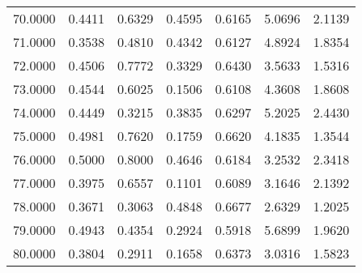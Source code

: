 \begin{longtable}{ p{}  p{}  p{}  p{}  p{} p{}  p{} }
70.0000	&	0.4411	&	0.6329	&	0.4595	&	0.6165	&	5.0696	&	2.1139	\\
71.0000	&	0.3538	&	0.4810	&	0.4342	&	0.6127	&	4.8924	&	1.8354	\\
72.0000	&	0.4506	&	0.7772	&	0.3329	&	0.6430	&	3.5633	&	1.5316	\\
73.0000	&	0.4544	&	0.6025	&	0.1506	&	0.6108	&	4.3608	&	1.8608	\\
74.0000	&	0.4449	&	0.3215	&	0.3835	&	0.6297	&	5.2025	&	2.4430	\\
75.0000	&	0.4981	&	0.7620	&	0.1759	&	0.6620	&	4.1835	&	1.3544	\\
76.0000	&	0.5000	&	0.8000	&	0.4646	&	0.6184	&	3.2532	&	2.3418	\\
77.0000	&	0.3975	&	0.6557	&	0.1101	&	0.6089	&	3.1646	&	2.1392	\\
78.0000	&	0.3671	&	0.3063	&	0.4848	&	0.6677	&	2.6329	&	1.2025	\\
79.0000	&	0.4943	&	0.4354	&	0.2924	&	0.5918	&	5.6899	&	1.9620	\\
80.0000	&	0.3804	&	0.2911	&	0.1658	&	0.6373	&	3.0316	&	1.5823	\\
\hline
		
\end{longtable}


